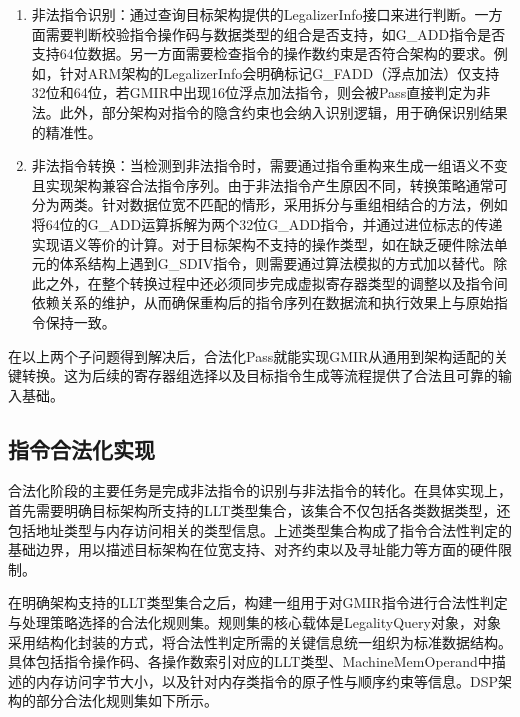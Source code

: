 \begin{enumerate}
	\item
	非法指令识别：通过查询目标架构提供的LegalizerInfo接口来进行判断。一方面需要判断校验指令操作码与数据类型的组合是否支持，如G\_ADD指令是否支持64位数据。另一方面需要检查指令的操作数约束是否符合架构的要求。例如，针对ARM架构的LegalizerInfo会明确标记G\_FADD（浮点加法）仅支持32位和64位，若GMIR中出现16位浮点加法指令，则会被Pass直接判定为非法。此外，部分架构对指令的隐含约束也会纳入识别逻辑，用于确保识别结果的精准性。
	
	\item
	非法指令转换：当检测到非法指令时，需要通过指令重构来生成一组语义不变且实现架构兼容合法指令序列。由于非法指令产生原因不同，转换策略通常可分为两类。针对数据位宽不匹配的情形，采用拆分与重组相结合的方法，例如将64位的G\_ADD运算拆解为两个32位G\_ADD指令，并通过进位标志的传递实现语义等价的计算。对于目标架构不支持的操作类型，如在缺乏硬件除法单元的体系结构上遇到G\_SDIV指令，则需要通过算法模拟的方式加以替代。除此之外，在整个转换过程中还必须同步完成虚拟寄存器类型的调整以及指令间依赖关系的维护，从而确保重构后的指令序列在数据流和执行效果上与原始指令保持一致。
	
\end{enumerate}

在以上两个子问题得到解决后，合法化Pass就能实现GMIR从通用到架构适配的关键转换。这为后续的寄存器组选择以及目标指令生成等流程提供了合法且可靠的输入基础。


\subsection{指令合法化实现}
合法化阶段的主要任务是完成非法指令的识别与非法指令的转化。在具体实现上，首先需要明确目标架构所支持的LLT类型集合，该集合不仅包括各类数据类型，还包括地址类型与内存访问相关的类型信息。上述类型集合构成了指令合法性判定的基础边界，用以描述目标架构在位宽支持、对齐约束以及寻址能力等方面的硬件限制。

\par

在明确架构支持的LLT类型集合之后，构建一组用于对GMIR指令进行合法性判定与处理策略选择的合法化规则集。规则集的核心载体是LegalityQuery对象，对象采用结构化封装的方式，将合法性判定所需的关键信息统一组织为标准数据结构。具体包括指令操作码、各操作数索引对应的LLT类型、MachineMemOperand中描述的内存访问字节大小，以及针对内存类指令的原子性与顺序约束等信息。DSP架构的部分合法化规则集如下所示。

